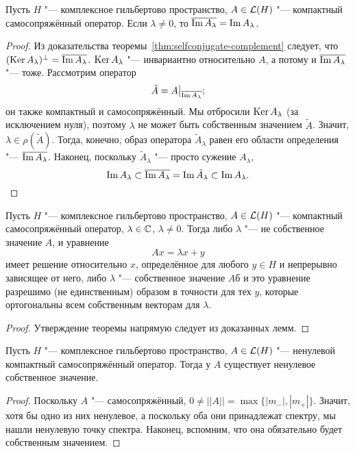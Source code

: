 \documentclass[main]{subfiles}
\begin{document}
\begin{lemma}%
  Пусть \( H \) "--- комплексное гильбертово пространство,
  \( A \in \Linears{H} \) "--- компактный самосопряжённый оператор.
  Если \( \lambda \ne 0 \),
  то \( \overline{\operatorname{Im} A_\lambda} = \operatorname{Im} A_\lambda \).
\end{lemma}
\begin{proof}
  Из доказательства теоремы~\ref{thm:selfconjugate-complement}
  следует, что \( (\operatorname{Ker} A_\lambda)^\perp = \overline{\operatorname{Im} A_\lambda} \).
  \( \operatorname{Ker} A_\lambda \) "--- инвариантно относительно \( A \),
  а потому и \( \overline{\operatorname{Im} A_\lambda} \) "--- тоже.
  Рассмотрим оператор
  \[ \tilde A = A \bigr|_{\overline{\operatorname{Im} A_\lambda}};\]
  он также компактный и самосопряжённый.
  Мы отбросили
  \( \operatorname{Ker} A_\lambda \) (за исключением нуля),
  поэтому  \( \lambda \)
  не может быть собственным значением \( \tilde A \).
  Значит, \( \lambda \in \rho(\tilde A) \).
  Тогда, конечно, образ оператора \( \tilde A_\lambda \) равен
  его области определения "--- \( \overline{\operatorname{Im} A_\lambda} \).
  Наконец, поскольку \( \tilde A_\lambda \) "--- просто сужение \( A_\lambda \),
  \[
    \operatorname{Im} A_\lambda \subset
    \overline{\operatorname{Im} A_\lambda} =
    \operatorname{Im} \tilde A_\lambda \subset
    \operatorname{Im} A_\lambda. \qedhere
  \]
\end{proof}

\begin{theorem*}
  Пусть \( H \) "--- комплексное гильбертово пространство,
  \( A \in \Linears{H} \) "--- компактный самосопряжённый оператор,
  \( \lambda \in \mathbb{C} \), \( \lambda \ne 0 \).
  Тогда либо \( \lambda \) "--- не собственное значение \( A \),
  и уравнение
  \[
    A x = \lambda x + y
  \]
  имеет решение относительно \( x \),
  определённое для любого \( y \in H \) и
  непрерывно зависящее от него,
  либо \( \lambda \) "--- собственное значение \( A \)б
  и это уравнение разрешимо
  (не единственным) образом
  в точности для тех \( y \), которые ортогональны
  всем собственным векторам для \( \lambda \).
\end{theorem*}
\begin{proof}
  Утверждение теоремы напрямую следует из доказанных лемм.
\end{proof}

\begin{lemma}\label{thm:ksco-eigenvalue}
  Пусть \( H \) "--- комплексное гильбертово пространство,
  \( A \in \Linears{H} \) "--- ненулевой компактный самосопряжённый оператор.
  Тогда у \( A \) существует ненулевое собственное значение.
\end{lemma}
\begin{proof}
  Поскольку \( A \) "--- самосопряжённый,
  \( 0 \ne ||A|| = \max \{ |m_-|, |m_+| \} \).
  Значит, хотя бы одно из них ненулевое,
  а поскольку оба они принадлежат спектру,
  мы нашли ненулевую точку спектра. Наконец,
  вспомним, что она обязательно будет
  собственным значением.
\end{proof}
\end{document}
